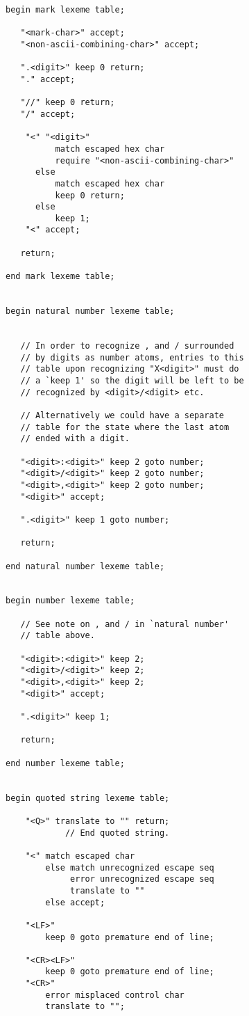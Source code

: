 \documentclass[12pt]{article}
\newenvironment{indpar}[1][0.3in]%
	{\begin{list}{}%
		     {\setlength{\itemsep}{0in}%
		      \setlength{\topsep}{0in}%
		      \setlength{\parsep}{1ex}%
		      \setlength{\labelwidth}{#1}%
		      \setlength{\leftmargin}{#1}%
		      \addtolength{\leftmargin}{\labelsep}}%
	 \item}%
	{\end{list}}
\begin{document}
\begin{indpar}
\begin{verbatim}
begin mark lexeme table;

   "<mark-char>" accept;
   "<non-ascii-combining-char>" accept;

   ".<digit>" keep 0 return;
   "." accept;

   "//" keep 0 return;
   "/" accept;

    "<" "<digit>"
          match escaped hex char
          require "<non-ascii-combining-char>"
      else
          match escaped hex char
          keep 0 return;
      else
          keep 1;
    "<" accept;

   return;

end mark lexeme table;


begin natural number lexeme table;


   // In order to recognize , and / surrounded
   // by digits as number atoms, entries to this
   // table upon recognizing "X<digit>" must do
   // a `keep 1' so the digit will be left to be
   // recognized by <digit>/<digit> etc.

   // Alternatively we could have a separate
   // table for the state where the last atom
   // ended with a digit.

   "<digit>:<digit>" keep 2 goto number;
   "<digit>/<digit>" keep 2 goto number;
   "<digit>,<digit>" keep 2 goto number;
   "<digit>" accept;

   ".<digit>" keep 1 goto number;

   return;

end natural number lexeme table;


begin number lexeme table;

   // See note on , and / in `natural number'
   // table above.

   "<digit>:<digit>" keep 2;
   "<digit>/<digit>" keep 2;
   "<digit>,<digit>" keep 2;
   "<digit>" accept;

   ".<digit>" keep 1;

   return;

end number lexeme table;


begin quoted string lexeme table;

    "<Q>" translate to "" return;
            // End quoted string.

    "<" match escaped char
        else match unrecognized escape seq
             error unrecognized escape seq
             translate to ""
        else accept;

    "<LF>"
        keep 0 goto premature end of line;

    "<CR><LF>"
        keep 0 goto premature end of line;
    "<CR>"
        error misplaced control char
        translate to "";


\end{verbatim}
\end{indpar}
\end{document}
